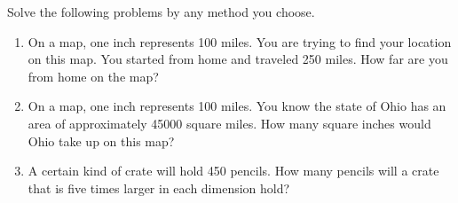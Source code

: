 \documentclass[nooutcomes, noauthor, handout]{ximera}
\begin{document}
\begin{problem}
Solve the following problems by any method you choose.  %
\begin{enumerate}
    \item On a map, one inch represents 100 miles.  You are trying to find your location on this map.  You started from home and traveled 250 miles.  How far are you from home on the map?
    \item On a map, one inch represents 100 miles.  You know the state of Ohio has an area of approximately 45000 square miles.  How many square inches would Ohio take up on this map?
    \item A certain kind of crate will hold 450 pencils.  How many pencils will a crate that is five times larger in each dimension hold?
\end{enumerate}




\end{problem}

\newpage
\end{document}
